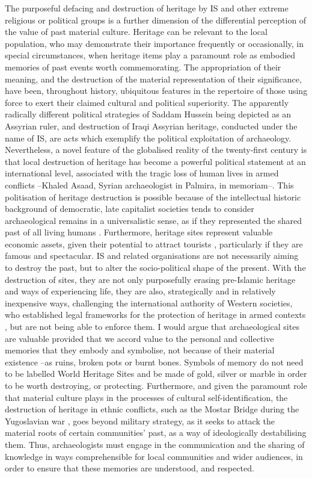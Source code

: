 		The purposeful defacing and destruction of heritage by IS and other extreme religious or political groups is a further dimension of the differential perception of the value of past material culture. Heritage can be relevant to the local population, who may demonstrate their importance frequently or occasionally, in special circumstances, when heritage items play a paramount role as embodied memories of past events worth commemorating. The appropriation of their meaning, and the destruction of the material representation of their significance, have been, throughout history, ubiquitous features in the repertoire of those using force to exert their claimed cultural and political superiority. The apparently radically different political strategies of Saddam Hussein being depicted as an Assyrian ruler, and destruction of Iraqi Assyrian heritage, conducted under the name of IS, are acts which exemplify the political exploitation of archaeology. Nevertheless, a novel feature of the globalised reality of the twenty-first century is that local destruction of heritage has become a powerful political statement at an international level, associated with the tragic loss of human lives in armed conflicts –Khaled Asaad, Syrian archaeologist in Palmira, in memoriam–. This politisation of heritage destruction is possible because of the intellectual historic background of democratic, late capitalist societies tends to consider archaeological remains in a universalistic sense, as if they represented the shared past of all living humans \parencite{Holtorf_2006}. Furthermore, heritage sites represent valuable economic assets, given their potential to attract tourists \parencite{Meskell_2002a}, particularly if they are famous and spectacular. IS and related organisations are not necessarily aiming to destroy the past, but to alter the socio-political shape of the present. With the destruction of sites, they are not only purposefully erasing pre-Islamic heritage and ways of experiencing life, they are also, strategically and in relatively inexpensive ways, challenging the international authority of Western societies, who established legal frameworks for the protection of heritage in armed contexts \parencite{Gerstenblith_2009}, but are not being able to enforce them. I would argue that archaeological sites are valuable provided that we accord value to the personal and collective memories that they embody and symbolise, not because of their material existence –as ruins, broken pots or burnt bones. Symbols of memory do not need to be labelled World Heritage Sites and be made of gold, silver or marble in order to be worth destroying, or protecting. Furthermore, and given the paramount role that material culture plays in the processes of cultural self-identification, the destruction of heritage in ethnic conflicts, such as the Mostar Bridge during the Yugoslavian war \parencite{Chapman_1994}, goes beyond military strategy, as it seeks to attack the material roots of certain communities’ past, as a way of ideologically destabilising them. Thus, archaeologists must engage in the communication and the sharing of knowledge in ways comprehensible for local communities and wider audiences, in order to ensure that these memories are understood, and respected.
		

